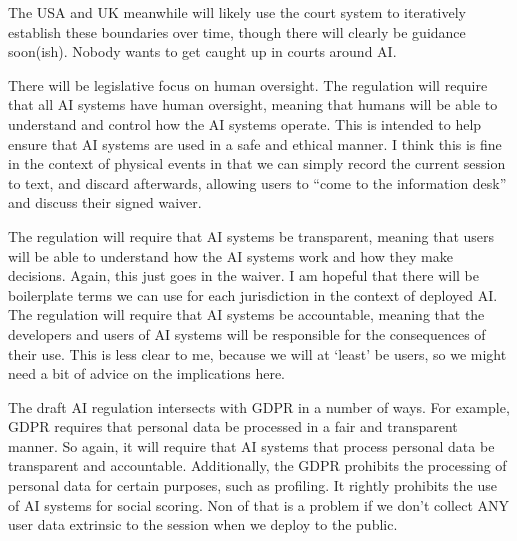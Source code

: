 The USA and UK meanwhile will likely use the court system to iteratively establish these boundaries over time, though there will clearly be guidance soon(ish). Nobody wants to get caught up in courts around AI.

There will be legislative focus on human oversight. The regulation will require that all AI systems have human oversight, meaning that humans will be able to understand and control how the AI systems operate. This is intended to help ensure that AI systems are used in a safe and ethical manner. I think this is fine in the context of physical events in that we can simply record the current session to text, and discard afterwards, allowing users to ``come to the information desk'' and discuss their signed waiver. \par 

The regulation will require that AI systems be transparent, meaning that users will be able to understand how the AI systems work and how they make decisions. Again, this just goes in the waiver. I am hopeful that there will be boilerplate terms we can use for each jurisdiction in the context of deployed AI. The regulation will require that AI systems be accountable, meaning that the developers and users of AI systems will be responsible for the consequences of their use. This is less clear to me, because we will at `least' be users, so we might need a bit of advice on the implications here.\par
The draft AI regulation intersects with GDPR in a number of ways. For example, GDPR requires that personal data be processed in a fair and transparent manner. So again, it will require that AI systems that process personal data be transparent and accountable. Additionally, the GDPR prohibits the processing of personal data for certain purposes, such as profiling. It rightly prohibits the use of AI systems for social scoring. Non of that is a problem if we don't collect ANY user data extrinsic to the session when we deploy to the public.\par
